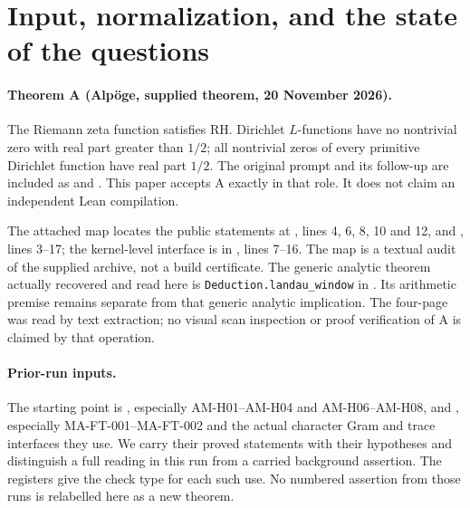 \documentclass[11pt,a4paper]{article}
\theoremstyle{definition}
\theoremstyle{remark}
\begin{document}
\begin{abstract}
nonordinary two-copy coefficient quotients, preordinary class
images, and uniformly bounded finite ray coefficient quotients
are constructed, while geometric ray norms and the required
two-dimensional singular regulator remain unproved.
Unconditional theta quasimodes and strong
resolvent limits extend to the degree-two cubic Hecke sector.
The arithmetic sparse-window inequality H04.4
for that cubic character has not been proved. Nor is a
gap in a proposed inference described as a theorem of
logical independence. Every numbered finding has a full
proof; the check register specifies which readings and
computations have actually been performed.
\end{abstract}

\tableofcontents
\clearpage

\section{Input, normalization, and the state of the questions}
\label{sec:input}

\paragraph{Theorem A (Alp\"oge, supplied theorem, 20 November 2026).}
The Riemann zeta function satisfies RH. Dirichlet $L$-functions
have no nontrivial zero with real part greater than $1/2$;
all nontrivial zeros of every primitive Dirichlet function
have real part $1/2$. The original prompt and its follow-up
are included as  and
. This paper accepts A exactly in
that role. It does not claim an independent Lean compilation.

The attached map 
locates the public statements at , lines
4, 6, 8, 10 and 12, and , lines
3--17; the kernel-level interface is in
, lines 7--16.
The map is a textual audit of the supplied archive, not a
build certificate. The generic analytic theorem actually
recovered and read here is \texttt{Deduction.landau\_window}
in .
Its arithmetic premise remains separate from that
generic analytic implication. The four-page
 was read by text extraction;
no visual scan inspection or proof verification of A is
claimed by that operation.

\paragraph{Prior-run inputs.}
The starting point is
,
especially AM-H01--AM-H04 and AM-H06--AM-H08, and
,
especially MA-FT-001--MA-FT-002 and the actual character
Gram and trace interfaces they use. We carry their proved
statements with their hypotheses and distinguish a full
reading in this run from a carried background assertion.
The registers give the check type for each such use.
No numbered assertion from those runs is relabelled here
as a new theorem.
\end{document}
